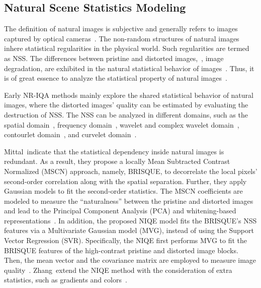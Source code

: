 \subsection{Natural Scene Statistics Modeling}
The definition of natural images is subjective and generally refers to images captured by optical cameras~\citep{mittal2012no}. The non-random structures of natural images inhere statistical regularities in the physical world. Such regularities are termed as NSS. The differences between pristine and distorted images,~\ie, image degradation, are exhibited in the natural statistical behavior of images~\citep{wandell1995foundations, moorthy2011blind}. Thus, it is of great essence to analyze the statistical property of natural images~\citep{ghadiyaram2017perceptual}. 

Early NR-IQA methods mainly explore the shared statistical behavior of natural images, where the distorted images' quality can be estimated by evaluating the destruction of NSS. The NSS can be analyzed in different domains, such as the spatial domain~\citep{mittal2012no}, frequency domain~\citep{saad2012blind, saad2010dct, lyu2008nonlinear}, wavelet and complex wavelet domain~\citep{wainwright1999scale, moorthy2011blind, moorthy2010two, tang2011learning, gao2013universal, zhang2014c}, contourlet domain~\citep{lu2010no}, and curvelet domain~\citep{liu2014no}.
	
Mittal~\etal indicate that the statistical dependency inside natural images is redundant. As a result, they propose a locally Mean Subtracted Contrast Normalized (MSCN) approach, namely, BRISQUE, to decorrelate the local pixels' second-order correlation along with the spatial separation. Further, they apply Gaussian models to fit the second-order statistics. The MSCN coefficients are modeled to measure the ``naturalness'' between the pristine and distorted images and lead to the Principal Component Analysis (PCA) and whitening-based representations~\citep{mittal2012no}. In addition, the proposed NIQE model fits the BRISQUE's NSS features via a Multivariate Gaussian model (MVG), instead of using the Support Vector Regression (SVR). Specifically, the NIQE first performs MVG to fit the BRISQUE features of the high-contrast pristine and distorted image blocks. Then, the mean vector and the covariance matrix are employed to measure image quality~\citep{mittal2012making}. Zhang~\etal extend the NIQE method with the consideration of extra statistics, such as gradients and colors~\citep{zhang2015feature}.
	
